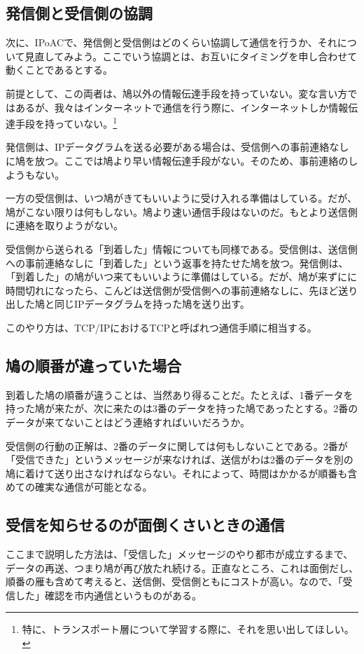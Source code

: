 \subsection{発信側と受信側の協調}
次に、IPoACで、発信側と受信側はどのくらい協調して通信を行うか、それについて見直してみよう。ここでいう協調とは、お互いにタイミングを申し合わせて動くことであるとする。

前提として、この両者は、鳩以外の情報伝達手段を持っていない。変な言い方ではあるが、我々はインターネットで通信を行う際に、インターネットしか情報伝達手段を持っていない。\footnote{特に、トランスポート層について学習する際に、それを思い出してほしい。}

発信側は、IPデータグラムを送る必要がある場合は、受信側への事前連絡なしに鳩を放つ。ここでは鳩より早い情報伝達手段がない。そのため、事前連絡のしようもない。

一方の受信側は、いつ鳩がきてもいいように受け入れる準備はしている。だが、鳩がこない限りは何もしない。鳩より速い通信手段はないのだ。もとより送信側に連絡を取りようがない。

受信側から送られる「到着した」情報についても同様である。受信側は、送信側への事前連絡なしに「到着した」という返事を持たせた鳩を放つ。発信側は、「到着した」の鳩がいつ来てもいいように準備はしている。だが、鳩が来ずにに時間切れになったら、こんどは送信側が受信側への事前連絡なしに、先ほど送り出した鳩と同じIPデータグラムを持った鳩を送り出す。

このやり方は、TCP/IPにおけるTCPと呼ばれつ通信手順に相当する。

\subsection{鳩の順番が違っていた場合}
到着した鳩の順番が違うことは、当然あり得ることだ。たとえば、1番データを持った鳩が来たが、次に来たのは3番のデータを持った鳩であったとする。2番のデータが来てないことはどう連絡すればいいだろうか。

受信側の行動の正解は、2番のデータに関しては何もしないことである。2番が「受信できた」というメッセージが来なければ、送信がわは2番のデータを別の鳩に着けて送り出さなければならない。それによって、時間はかかるが順番も含めての確実な通信が可能となる。


\subsection{受信を知らせるのが面倒くさいときの通信}
ここまで説明した方法は、「受信した」メッセージのやり都市が成立するまで、データの再送、つまり鳩が再び放たれ続ける。正直なところ、これは面倒だし、順番の雁も含めて考えると、送信側、受信側ともにコストが高い。なので、「受信した」確認を市内通信というものがある。

